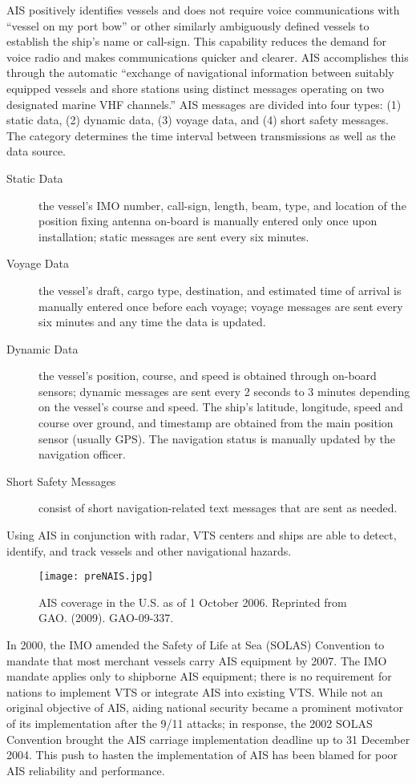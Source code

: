 \documentclass[twoside,symmetric,notoc]{tufte-book}
\begin{document}
\par{AIS positively identifies vessels and does not require voice communications with ``vessel on my port bow'' or other similarly ambiguously defined vessels to establish the ship's name or call-sign. This capability reduces the demand for voice radio and makes communications quicker and clearer. AIS accomplishes this through the automatic ``exchange of navigational information between suitably equipped vessels and shore stations using distinct messages \textellipsis operating on two designated marine VHF channels.''\cite{NMEA} AIS messages are divided into four types: (1) static data, (2) dynamic data, (3) voyage data, and (4) short safety messages. The category determines the time interval between transmissions as well as the data source.\cite{TRB}
\begin{description}
\item[Static Data] the vessel's IMO number, call-sign, length, beam, type, and location of the position fixing antenna on-board is manually entered only once upon installation; static messages are sent every six minutes. 
\item[Voyage Data] the vessel's draft, cargo type, destination, and estimated time of arrival is manually entered once before each voyage; voyage messages are sent every six minutes and any time the data is updated. 
\item[Dynamic Data] the vessel's position, course, and speed is obtained through on-board sensors; dynamic messages are sent every 2 seconds to 3 minutes depending on the vessel's course and speed. The ship's latitude, longitude, speed and course over ground, and timestamp are obtained from the main position sensor (usually GPS). The navigation status is manually updated by the navigation officer.
\item[Short Safety Messages] consist of short navigation-related text messages that are sent as needed. 
\end{description}
Using AIS in conjunction with radar, VTS centers and ships are able to detect, identify, and track vessels and other navigational hazards.
\begin{figure}
	\centering
		\texttt{[image: preNAIS.jpg]}
	\caption[AIS coverage in the U.S. as of 1 October 2006.]{AIS coverage in the U.S. as of 1 October 2006. Reprinted from GAO. (2009). GAO-09-337.}
	\label{fig:preNAIS}
	\forceversofloat
\end{figure}
}
\par{%
In 2000, the IMO amended the Safety of Life at Sea (SOLAS) Convention to mandate that most merchant vessels carry AIS equipment by 2007.\cite{Swedish_Club} The IMO mandate applies only to shipborne AIS equipment; there is no requirement for nations to implement VTS or integrate AIS into existing VTS.\cite{IALA} While not an original objective of AIS, aiding national security became a prominent motivator of its implementation after the 9/11 attacks; in response, the 2002 SOLAS Convention brought the AIS carriage implementation deadline up to 31 December 2004.\cite{FR} This push to hasten the implementation of AIS has been blamed for poor AIS reliability and performance.\cite{Lu}
}
\end{document}
